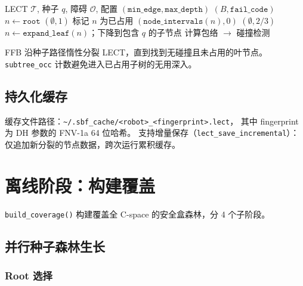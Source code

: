 \documentclass[11pt,a4paper]{article}
\begin{document}
\begin{algorithm}[t]
\caption{\texttt{find\_free\_box} — 在 LECT 中搜索安全盒}
\label{alg:ffb}
\begin{algorithmic}[1]
\Require LECT $\mathcal{T}$, 种子 $q$, 障碍 $\mathcal{O}$, 配置 $(\texttt{min\_edge}, \texttt{max\_depth})$
\Ensure $(B, \texttt{fail\_code})$
\State $n \leftarrow \texttt{root}$
   \Return $(\emptyset, 1)$ \EndIf
    \State 标记 $n$ 为已占用
    \State \Return $(\texttt{node\_intervals}(n), 0)$ 
  \EndIf
    \State \Return $(\emptyset, 2/3)$
  \EndIf
  \State $n \leftarrow \texttt{expand\_leaf}(n)$；下降到包含 $q$ 的子节点
  \State 计算包络 $\rightarrow$ 碰撞检测
\EndWhile
\end{algorithmic}
\end{algorithm}

FFB 沿种子路径惰性分裂 LECT，直到找到无碰撞且未占用的叶节点。
\texttt{subtree\_occ} 计数避免进入已占用子树的无用深入。

\subsection{持久化缓存}

缓存文件路径：\texttt{\textasciitilde/.sbf\_cache/<robot>\_<fingerprint>.lect}，
其中 fingerprint 为 DH 参数的 FNV-1a 64 位哈希。
支持增量保存（\texttt{lect\_save\_incremental}）：
仅追加新分裂的节点数据，跨次运行累积缓存。


\section{离线阶段：构建覆盖}
\label{sec:build}

\texttt{build\_coverage()} 构建覆盖全 C-space 的安全盒森林，分 4 个子阶段。

\subsection{并行种子森林生长}

\subsubsection{Root 选择}
\end{document}
